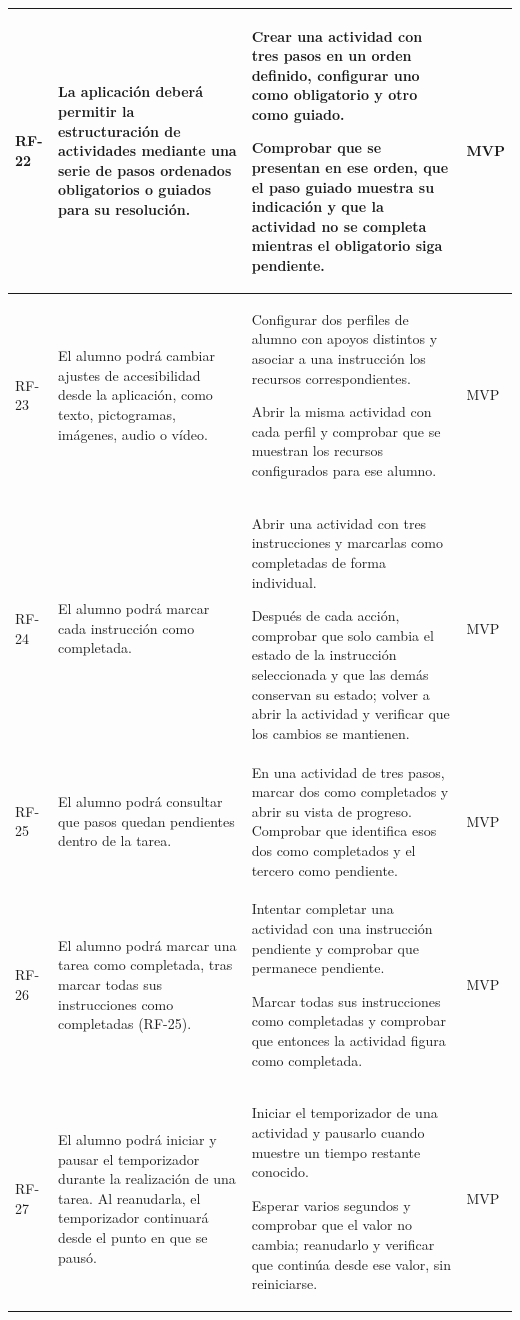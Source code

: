 \begin{longtable}{|>{\raggedright\arraybackslash}p{1cm}|>{\raggedright\arraybackslash}p{6cm}|>{\criterioinicio}p{5.9cm}<{\criteriofin}|>{\centering\arraybackslash}p{1.8cm}|}
\hline
\hypertarget{rf-22}{}RF-22 & La aplicación deberá permitir la estructuración de actividades mediante una serie de pasos ordenados obligatorios o guiados para su resolución. & Crear una actividad con tres pasos en un orden definido, configurar uno como obligatorio y otro como guiado. \item Comprobar que se presentan en ese orden, que el paso guiado muestra su indicación y que la actividad no se completa mientras el obligatorio siga pendiente. & MVP \\
\hline
\hypertarget{rf-23}{}RF-23 & El alumno podrá cambiar ajustes de accesibilidad desde la aplicación, como texto, pictogramas, imágenes, audio o vídeo. & Configurar dos perfiles de alumno con apoyos distintos y asociar a una instrucción los recursos correspondientes. \item Abrir la misma actividad con cada perfil y comprobar que se muestran los recursos configurados para ese alumno. & MVP \\
\hline
\hypertarget{rf-24}{}RF-24 & El alumno podrá marcar cada instrucción como completada. & Abrir una actividad con tres instrucciones y marcarlas como completadas de forma individual. \item Después de cada acción, comprobar que solo cambia el estado de la instrucción seleccionada y que las demás conservan su estado; volver a abrir la actividad y verificar que los cambios se mantienen. & MVP \\
\hline
\hypertarget{rf-25}{}RF-25 & El alumno podrá consultar que pasos quedan pendientes dentro de la tarea. & En una actividad de tres pasos, marcar dos como completados y abrir su vista de progreso. Comprobar que identifica esos dos como completados y el tercero como pendiente. & MVP \\
\hline
\hypertarget{rf-26}{}RF-26 & El alumno podrá marcar una tarea como completada, tras marcar todas sus instrucciones como completadas (RF-25). & Intentar completar una actividad con una instrucción pendiente y comprobar que permanece pendiente. \item Marcar todas sus instrucciones como completadas y comprobar que entonces la actividad figura como completada. & MVP \\
\hline
\hypertarget{rf-27}{}RF-27 & El alumno podrá iniciar y pausar el temporizador durante la realización de una tarea. Al reanudarla, el temporizador continuará desde el punto en que se pausó. & Iniciar el temporizador de una actividad y pausarlo cuando muestre un tiempo restante conocido. \item Esperar varios segundos y comprobar que el valor no cambia; reanudarlo y verificar que continúa desde ese valor, sin reiniciarse. & MVP \\

\end{longtable}
